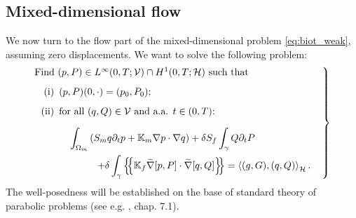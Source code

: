 \documentclass[a4paper]{article}
\def\agrad{\widetilde\nabla}
\def\avg#1{\left\{\mskip-5mu\left\{#1\right\}\mskip-5mu\right\}}
\def\div{\operatorname{div}}
\def\dt{\prtl_t}
\def\dual#1#2{\left\langle #1,#2\right\rangle}
\def\Hf{\mathcal H}
\def\jmp#1{\left\llbracket #1 \right\rrbracket}
\def\nnu{\vc\nu}
\def\pphi{{\varphi}}
\def\prtl{\partial}
\def\Real{{\mathbf R}}
\def\tn#1{{\mathbb{#1}}}    %
\def\Vf{{\mathcal V}} %
\def\vc#1{\mathbf{\boldsymbol{#1}}}     %
\newcommand{\eq}[1]{\begin{equation}#1\end{equation}}
\newcommand{\opm}{ %
  {\mathbin{
    \mathchoice
      {\buildcirclepm{\displaystyle     }{0.14ex}{0.95}{0.05ex}{.7}}
      {\buildcirclepm{\textstyle        }{0.14ex}{0.95}{0.05ex}{.7}}
      {\buildcirclepm{\scriptstyle      }{0.13ex}{0.955}{0.04ex}{.55}}
      {\buildcirclepm{\scriptscriptstyle}{0.08ex}{0.95}{0.03ex}{.45}}
  }} 
}
\newcommand\buildcirclepm[5]{%
  \begin{tikzpicture}[baseline=(X.base), inner sep=-#5, outer sep=-.65]
    \node[draw,circle,line width=#4] (X)  {\footnotesize\raisebox{#2}{\scalebox{#3}{$#1\pm$}}};
  \end{tikzpicture}%
}
\begin{document}
\subsection{Mixed-dimensional flow}

We now turn to the flow part of the mixed-dimensional problem \eqref{eq:biot_weak}, assuming zero displacements.
We want to 
solve the following problem:
\eq{ \label{eq:flow_weak} \left.\begin{minipage}{0.85\textwidth}
Find $(p,P)\in L^\infty(0,T;\Vf)\cap H^1(0,T;\Hf)$ such that
\begin{itemize}
\item[(i)] $(p,P)(0,\cdot)=(p_0,P_0)$;
\item[(ii)] for all $(q,Q)\in\Vf$ and a.a. $t\in(0,T)$:
\[ \begin{aligned}\int_{\Omega_m}\left(S_m q\dt p + \tn K_m\nabla p\cdot\nabla q\right) + \delta S_f\int_\gamma Q\dt P \hspace{2cm}\\
+ \delta\int_\gamma\avg{\tn K_f\agrad[p,P]\cdot\agrad[q,Q]}
= \dual{(g,G)}{(q,Q)}_\Hf.\end{aligned} \]
\end{itemize}
\end{minipage}\right\} }
The well-posedness will be established on the base of standard theory of parabolic problems (see e.g. \cite{evans_pde}, chap. 7.1).
\end{document}
